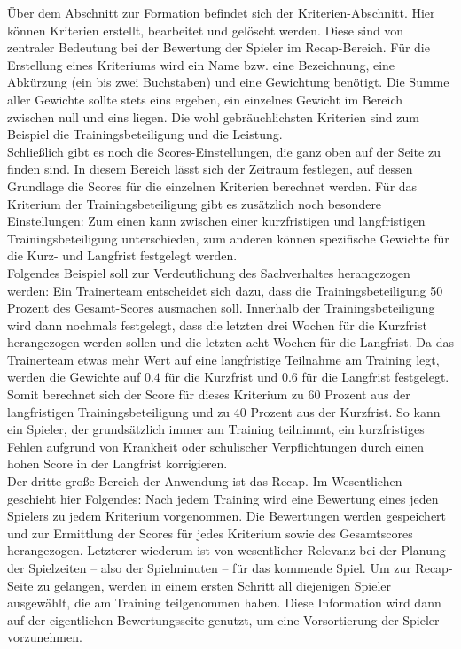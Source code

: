Über dem Abschnitt zur Formation befindet sich der Kriterien-Abschnitt. Hier können 
Kriterien erstellt, bearbeitet und gelöscht werden. Diese sind von zentraler 
Bedeutung bei der Bewertung der Spieler im Recap-Bereich. Für die Erstellung eines 
Kriteriums wird ein Name bzw. eine Bezeichnung, eine Abkürzung (ein bis zwei 
Buchstaben) und eine Gewichtung benötigt. Die Summe aller Gewichte sollte stets 
eins ergeben, ein einzelnes Gewicht im Bereich zwischen null und eins liegen. 
Die wohl gebräuchlichsten Kriterien sind zum Beispiel die Trainingsbeteiligung und 
die Leistung. \\ 
Schließlich gibt es noch die Scores-Einstellungen, die ganz oben auf der Seite 
zu finden sind. In diesem Bereich lässt sich der Zeitraum festlegen, auf dessen 
Grundlage die Scores für die einzelnen Kriterien berechnet werden. Für das 
Kriterium der Trainingsbeteiligung gibt es zusätzlich noch besondere Einstellungen: Zum 
einen kann zwischen einer kurzfristigen und langfristigen Trainingsbeteiligung 
unterschieden, zum anderen können spezifische Gewichte für die Kurz- und Langfrist 
festgelegt werden. \\ 
Folgendes Beispiel soll zur Verdeutlichung des Sachverhaltes herangezogen werden: 
Ein Trainerteam entscheidet sich dazu, dass die Trainingsbeteiligung 50 Prozent 
des Gesamt-Scores ausmachen soll. Innerhalb der Trainingsbeteiligung wird dann 
nochmals festgelegt, dass die letzten drei Wochen für die Kurzfrist herangezogen 
werden sollen und die letzten acht Wochen für die Langfrist. Da das Trainerteam 
etwas mehr Wert auf eine langfristige Teilnahme am Training legt, werden die 
Gewichte auf $ 0.4 $ für die Kurzfrist und $ 0.6 $ für die Langfrist festgelegt. 
Somit berechnet sich der Score für dieses Kriterium zu 60 Prozent aus der 
langfristigen Trainingsbeteiligung und zu 40 Prozent aus der Kurzfrist. So kann 
ein Spieler, der grundsätzlich immer am Training teilnimmt, ein kurzfristiges 
Fehlen aufgrund von Krankheit oder schulischer Verpflichtungen durch einen hohen 
Score in der Langfrist korrigieren. \\ 
Der dritte große Bereich der Anwendung ist das Recap. Im Wesentlichen geschieht 
hier Folgendes: Nach jedem Training wird eine Bewertung eines jeden Spielers zu jedem 
Kriterium vorgenommen. Die Bewertungen werden gespeichert und zur Ermittlung der 
Scores für jedes Kriterium sowie des Gesamtscores herangezogen. Letzterer wiederum 
ist von wesentlicher Relevanz bei der Planung der Spielzeiten -- also der 
Spielminuten -- für das kommende Spiel. Um zur Recap-Seite zu gelangen, werden in 
einem ersten Schritt all diejenigen Spieler ausgewählt, die am Training 
teilgenommen haben. Diese Information wird dann auf der eigentlichen 
Bewertungsseite genutzt, um eine Vorsortierung der Spieler vorzunehmen. \\ 


